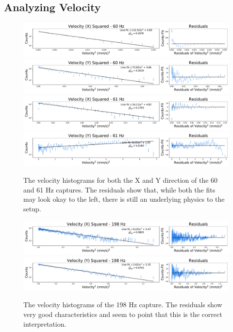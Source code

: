 \documentclass[12pt]{article}
\begin{document}
\subsection{Analyzing Velocity}
\begin{figure}[!ht]
\centering
    \includegraphics[width=\textwidth]{data_01_x_vel.pdf}
    \includegraphics[width=\textwidth]{data_01_y_vel.pdf}
    \includegraphics[width=\textwidth]{data_03_x_vel.pdf}
    \includegraphics[width=\textwidth]{data_03_y_vel.pdf}
	\caption{The velocity histograms for both the X and Y direction of the 60 and 61 Hz captures. The residuals show that, while both the fits may look okay to the left, there is still an underlying physics to the setup.}
    \label{fig:low_hz_vel}
\end{figure}

\begin{figure}[!ht]
\centering
    \includegraphics[width=\textwidth]{data_04_x_vel.pdf}
    \includegraphics[width=\textwidth]{data_04_y_vel.pdf}
	\caption{The velocity histograms of the 198 Hz capture. The residuals show very good characteristics and seem to point that this is the correct interpretation.}
    \label{fig:high_hz_vel}
\end{figure}
\end{document}
